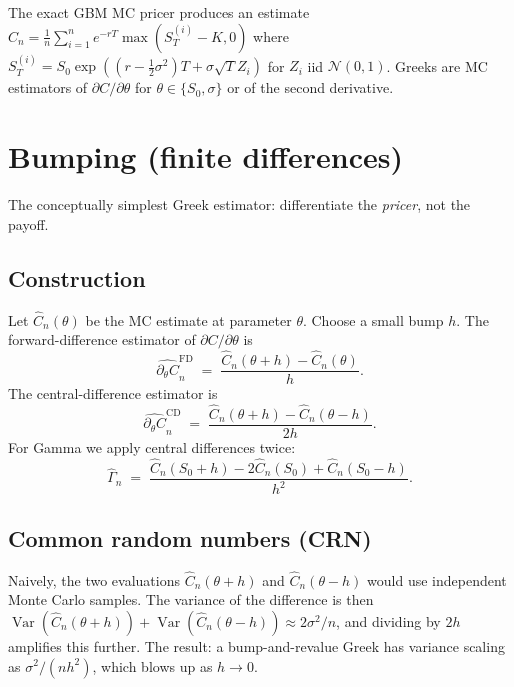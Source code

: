 \documentclass[11pt,a4paper]{article}
\theoremstyle{plain}
\theoremstyle{definition}
\theoremstyle{remark}
\newcommand{\Var}{\operatorname{Var}}
\begin{document}
The exact GBM MC pricer produces an estimate
$\hat C_n = \frac{1}{n}\sum_{i=1}^n e^{-rT}\max(S_T^{(i)} - K, 0)$
where $S_T^{(i)} = S_0 \exp((r-\frac{1}{2}\sigma^2)T + \sigma\sqrt T
Z_i)$ for $Z_i$ iid $\mathcal N(0,1)$. Greeks are MC estimators of
$\partial C / \partial \theta$ for $\theta \in \{S_0, \sigma\}$ or
of the second derivative.

\section{Bumping (finite differences)}
\label{sec:bumping}

The conceptually simplest Greek estimator: differentiate the
\emph{pricer}, not the payoff.

\subsection{Construction}

Let $\hat C_n(\theta)$ be the MC estimate at parameter $\theta$.
Choose a small bump $h$. The forward-difference estimator of
$\partial C/\partial\theta$ is
\begin{equation}
\widehat{\partial_\theta C}_n^{\mathrm{FD}}
\;=\; \frac{\hat C_n(\theta + h) - \hat C_n(\theta)}{h}.
\end{equation}
The central-difference estimator is
\begin{equation}
\widehat{\partial_\theta C}_n^{\mathrm{CD}}
\;=\; \frac{\hat C_n(\theta + h) - \hat C_n(\theta - h)}{2h}.
\end{equation}
For Gamma we apply central differences twice:
\begin{equation}
\widehat{\Gamma}_n
\;=\; \frac{\hat C_n(S_0 + h) - 2\hat C_n(S_0) + \hat C_n(S_0 - h)}{h^2}.
\end{equation}

\subsection{Common random numbers (CRN)}

Naively, the two evaluations $\hat C_n(\theta + h)$ and $\hat
C_n(\theta - h)$ would use independent Monte Carlo samples. The
variance of the difference is then $\Var(\hat C_n(\theta + h)) +
\Var(\hat C_n(\theta - h)) \approx 2 \sigma^2/n$, and dividing by
$2h$ amplifies this further. The result: a bump-and-revalue Greek
has variance scaling as $\sigma^2/(n h^2)$, which blows up as
$h \to 0$.
\end{document}
